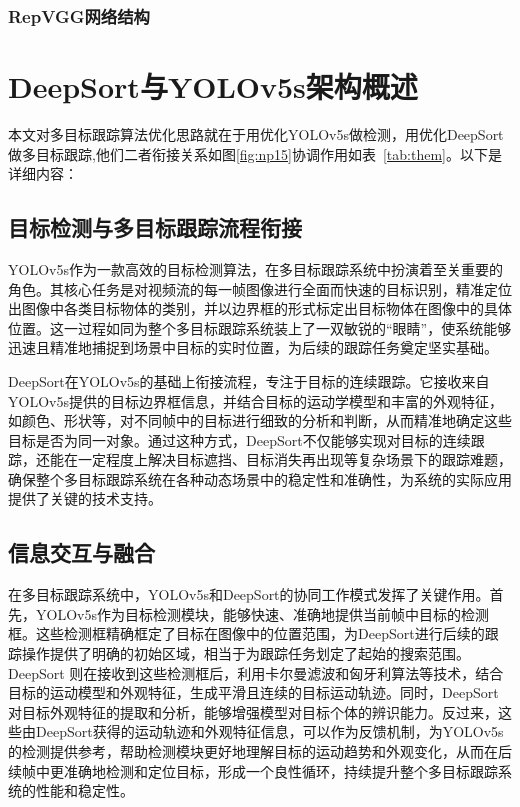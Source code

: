 \subsubsection{RepVGG网络结构}


\section{DeepSort与YOLOv5s架构概述}

本文对多目标跟踪算法优化思路就在于用优化YOLOv5s做检测，用优化DeepSort做多目标跟踪,他们二者衔接关系如图\ref{fig:np15}协调作用如表~\ref{tab:them}。以下是详细内容：


\subsection{目标检测与多目标跟踪流程衔接}

YOLOv5s作为一款高效的目标检测算法，在多目标跟踪系统中扮演着至关重要的角色。其核心任务是对视频流的每一帧图像进行全面而快速的目标识别，精准定位出图像中各类目标物体的类别，并以边界框的形式标定出目标物体在图像中的具体位置。这一过程如同为整个多目标跟踪系统装上了一双敏锐的“眼睛”，使系统能够迅速且精准地捕捉到场景中目标的实时位置，为后续的跟踪任务奠定坚实基础。

DeepSort在YOLOv5s的基础上衔接流程，专注于目标的连续跟踪。它接收来自YOLOv5s提供的目标边界框信息，并结合目标的运动学模型和丰富的外观特征，如颜色、形状等，对不同帧中的目标进行细致的分析和判断，从而精准地确定这些目标是否为同一对象。通过这种方式，DeepSort不仅能够实现对目标的连续跟踪，还能在一定程度上解决目标遮挡、目标消失再出现等复杂场景下的跟踪难题，确保整个多目标跟踪系统在各种动态场景中的稳定性和准确性，为系统的实际应用提供了关键的技术支持。



\subsection{信息交互与融合}
在多目标跟踪系统中，YOLOv5s和DeepSort的协同工作模式发挥了关键作用。首先，YOLOv5s作为目标检测模块，能够快速、准确地提供当前帧中目标的检测框。这些检测框精确框定了目标在图像中的位置范围，为DeepSort进行后续的跟踪操作提供了明确的初始区域，相当于为跟踪任务划定了起始的搜索范围。DeepSort 则在接收到这些检测框后，利用卡尔曼滤波和匈牙利算法等技术，结合目标的运动模型和外观特征，生成平滑且连续的目标运动轨迹。同时，DeepSort对目标外观特征的提取和分析，能够增强模型对目标个体的辨识能力。反过来，这些由DeepSort获得的运动轨迹和外观特征信息，可以作为反馈机制，为YOLOv5s的检测提供参考，帮助检测模块更好地理解目标的运动趋势和外观变化，从而在后续帧中更准确地检测和定位目标，形成一个良性循环，持续提升整个多目标跟踪系统的性能和稳定性。

